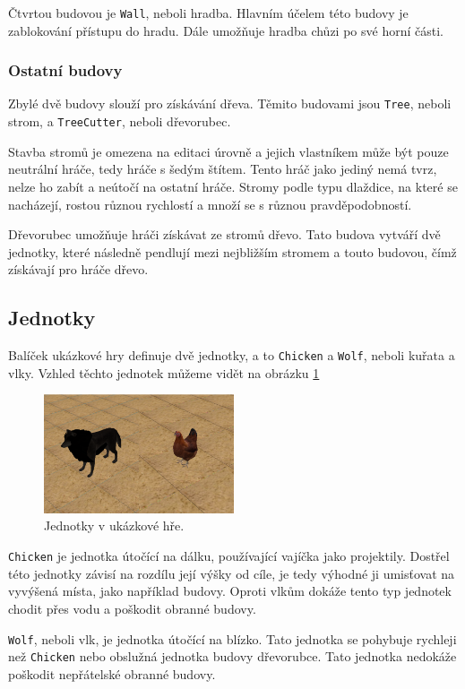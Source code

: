 Čtvrtou budovou je \texttt{Wall}, neboli hradba. Hlavním účelem této budovy je zablokování přístupu do hradu. Dále umožňuje hradba chůzi po své horní části.

\subsubsection{Ostatní budovy}
Zbylé dvě budovy slouží pro získávání dřeva. Těmito budovami jsou \texttt{Tree}, neboli strom, a \texttt{TreeCutter}, neboli dřevorubec.

Stavba stromů je omezena na editaci úrovně a jejich vlastníkem může být pouze neutrální hráče, tedy hráče s šedým štítem. Tento hráč jako jediný nemá tvrz, nelze ho zabít a neútočí na ostatní hráče. Stromy podle typu dlaždice, na které se nacházejí, rostou různou rychlostí a množí se s různou pravděpodobností.

Dřevorubec umožňuje hráči získávat ze stromů dřevo. Tato budova vytváří dvě jednotky, které následně pendlují mezi nejbližším stromem a touto budovou, čímž získávají pro hráče dřevo.

\subsection{Jednotky}
Balíček ukázkové hry definuje dvě jednotky, a to \texttt{Chicken} a \texttt{Wolf}, neboli kuřata a vlky. Vzhled těchto jednotek můžeme vidět na obrázku \ref{fig:units}

\begin{figure}[h]
	\centering
	\includegraphics[width=0.5\textwidth]{img/Units.png}
	\caption{Jednotky v ukázkové hře.}
	\label{fig:units}
\end{figure}

\texttt{Chicken} je jednotka útočící na dálku, používající vajíčka jako projektily. Dostřel této jednotky závisí na rozdílu její výšky od cíle, je tedy výhodné ji umisťovat na vyvýšená místa, jako například budovy. Oproti vlkům dokáže tento typ jednotek chodit přes vodu a poškodit obranné budovy.

\texttt{Wolf}, neboli vlk, je jednotka útočící na blízko. Tato jednotka se pohybuje rychleji než \texttt{Chicken} nebo obslužná jednotka budovy dřevorubce. Tato jednotka nedokáže poškodit nepřátelské obranné budovy.


